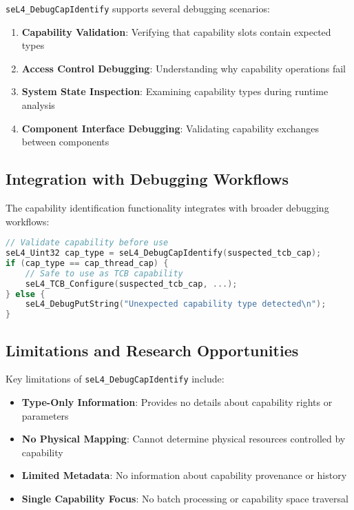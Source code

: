 \documentclass[11pt,a4paper]{article}
\begin{document}
\texttt{seL4\_DebugCapIdentify} supports several debugging scenarios:

\begin{enumerate}
\item \textbf{Capability Validation}: Verifying that capability slots contain expected types
\item \textbf{Access Control Debugging}: Understanding why capability operations fail
\item \textbf{System State Inspection}: Examining capability types during runtime analysis
\item \textbf{Component Interface Debugging}: Validating capability exchanges between components
\end{enumerate}

\subsection{Integration with Debugging Workflows}

The capability identification functionality integrates with broader debugging workflows:

\begin{lstlisting}[caption=Example Usage Pattern for Capability Debugging, language=C]
// Validate capability before use
seL4_Uint32 cap_type = seL4_DebugCapIdentify(suspected_tcb_cap);
if (cap_type == cap_thread_cap) {
    // Safe to use as TCB capability
    seL4_TCB_Configure(suspected_tcb_cap, ...);
} else {
    seL4_DebugPutString("Unexpected capability type detected\n");
}
\end{lstlisting}

\subsection{Limitations and Research Opportunities}

Key limitations of \texttt{seL4\_DebugCapIdentify} include:

\begin{itemize}
\item \textbf{Type-Only Information}: Provides no details about capability rights or parameters
\item \textbf{No Physical Mapping}: Cannot determine physical resources controlled by capability
\item \textbf{Limited Metadata}: No information about capability provenance or history
\item \textbf{Single Capability Focus}: No batch processing or capability space traversal
\end{itemize}
\end{document}
